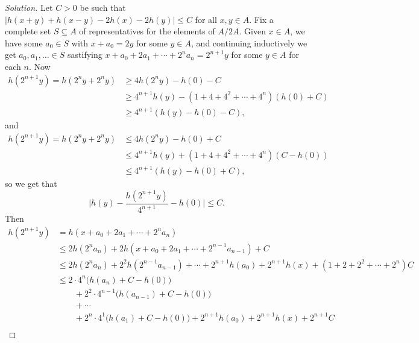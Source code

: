 \documentclass[a4paper]{article}
\theoremstyle{definition}
\begin{document}
\begin{enumerate}
        \begin{proof}[Solution]
            Let $C>0$ be such that $|h(x+y)+h(x-y)-2h(x)-2h(y)|\le C$ for all
            $x,y\in A$. Fix a complete set $S\subseteq A$ of representatives for
            the elements of $A/2A$. Given $x\in A$, we have some $a_0\in S$ with
            $x+a_0=2y$ for some $y\in A$, and continuing inductively we get
            $a_0,a_1,\ldots\in S$ sastifying $x+a_0+2a_1+\cdots+2^na_n=2^{n+1}y$
            for some $y\in A$ for each $n$. Now
            \begin{align*}
                h(2^{n+1}y) = h(2^ny + 2^ny)
                    &\ge 4h(2^ny) - h(0) - C \\
                    &\ge 4^{n+1}h(y) - (1 + 4 + 4^2 + \cdots + 4^n)(h(0)+C) \\
                    &\ge 4^{n+1}(h(y)-h(0)-C),
            \end{align*}
            and
            \begin{align*}
                h(2^{n+1}y) = h(2^ny+2^ny)
                    &\le 4h(2^ny) - h(0) + C \\
                    &\le 4^{n+1}h(y) + (1+4+4^2+\cdots+4^n)(C-h(0)) \\
                    &\le 4^{n+1}(h(y)-h(0)+C),
            \end{align*}
            so we get that
            \begin{equation*}
                \biggl|h(y)-\frac{h(2^{n+1}y)}{4^{n+1}}-h(0)\biggr| \le C.
            \end{equation*}
            Then
            \begin{align*}
                h(2^{n+1}y)
                    &= h(x+a_0+2a_1+\cdots+2^na_n) \\
                    &\le 2h(2^na_n) + 2h(x+a_0+2a_1+\cdots+2^{n-1}a_{n-1}) + C \\
                    &\le 2h(2^na_n) + 2^2h(2^{n-1}a_{n-1}) + \cdots
                        + 2^{n+1}h(a_0) + 2^{n+1}h(x) + (1+2+2^2+\cdots+2^n)C \\
                    &\le 2\cdot4^n\bigl(h(a_n)+C-h(0)\bigr) \\
                    &\qquad + 2^2\cdot4^{n-1}\bigl(h(a_{n-1})+C-h(0)\bigr) \\
                    &\qquad + \cdots \\
                    &\qquad + 2^n\cdot4^1\bigl(h(a_1)+C-h(0)\bigr)
                        + 2^{n+1}h(a_0) + 2^{n+1}h(x) + 2^{n+1}C \\

\end{align*}
\end{proof}
\end{enumerate}
\end{document}
